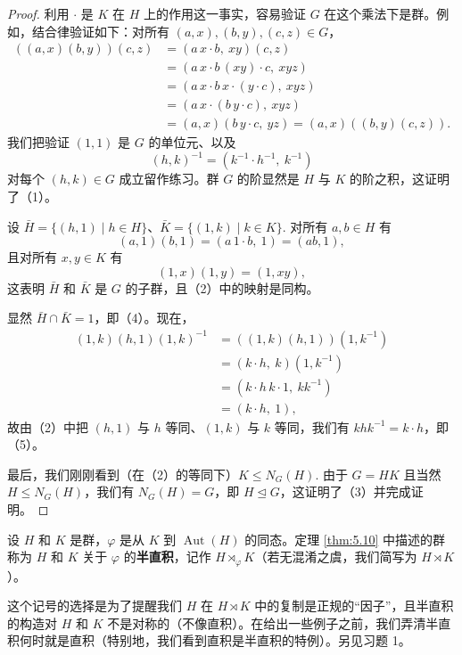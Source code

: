 \begin{proof}
利用 \(\cdot\) 是 \(K\) 在 \(H\) 上的作用这一事实，容易验证 \(G\) 在这个乘法下是群。例如，结合律验证如下：对所有 \((a, x), (b, y), (c, z) \in G\)，
\[
\begin{aligned}
((a, x)(b, y))(c, z) &= (a\, x \cdot b,\ xy)(c, z) \\
&= (a\, x \cdot b\, (xy) \cdot c,\ xyz) \\
&= (a\, x \cdot b\, x \cdot (y \cdot c),\ xyz) \\
&= (a\, x \cdot (b\, y \cdot c),\ xyz) \\
&= (a, x)(b\, y \cdot c,\ yz) = (a, x)((b, y)(c, z)).
\end{aligned}
\]
我们把验证 \((1, 1)\) 是 \(G\) 的单位元、以及
\[
(h, k)^{-1} = (k^{-1} \cdot h^{-1},\ k^{-1})
\]
对每个 \((h, k) \in G\) 成立留作练习。群 \(G\) 的阶显然是 \(H\) 与 \(K\) 的阶之积，这证明了（1）。

设 \(\bar{H} = \{(h, 1) \mid h \in H\}\)、\(\bar{K} = \{(1, k) \mid k \in K\}\). 对所有 \(a, b \in H\) 有
\[
(a, 1)(b, 1) = (a\, 1 \cdot b,\ 1) = (ab, 1),
\]
且对所有 \(x, y \in K\) 有
\[
(1, x)(1, y) = (1, xy),
\]
这表明 \(\bar{H}\) 和 \(\bar{K}\) 是 \(G\) 的子群，且（2）中的映射是同构。

显然 \(\bar{H} \cap \bar{K} = 1\)，即（4）。现在，
\[
\begin{aligned}
(1, k)(h, 1)(1, k)^{-1} &= ((1, k)(h, 1))(1, k^{-1}) \\
&= (k \cdot h,\ k)(1, k^{-1}) \\
&= (k \cdot h\, k \cdot 1,\ kk^{-1}) \\
&= (k \cdot h,\ 1),
\end{aligned}
\]
故由（2）中把 \((h, 1)\) 与 \(h\) 等同、\((1, k)\) 与 \(k\) 等同，我们有 \(khk^{-1} = k \cdot h\)，即（5）。

最后，我们刚刚看到（在（2）的等同下）\(K \leq N_G(H)\). 由于 \(G = HK\) 且当然 \(H \leq N_G(H)\)，我们有 \(N_G(H) = G\)，即 \(H \trianglelefteq G\)，这证明了（3）并完成证明。
\end{proof}

\begin{definition}
设 \(H\) 和 \(K\) 是群，\(\varphi\) 是从 \(K\) 到 \(\operatorname{Aut}(H)\) 的同态。定理 \ref{thm:5.10} 中描述的群称为 \(H\) 和 \(K\) 关于 \(\varphi\) 的\textbf{半直积}，记作 \(H \rtimes_\varphi K\)（若无混淆之虞，我们简写为 \(H \rtimes K\)）。
\end{definition}

这个记号的选择是为了提醒我们 \(H\) 在 \(H \rtimes K\) 中的复制是正规的“因子”，且半直积的构造对 \(H\) 和 \(K\) 不是对称的（不像直积）。在给出一些例子之前，我们弄清半直积何时就是直积（特别地，我们看到直积是半直积的特例）。另见习题 1。

